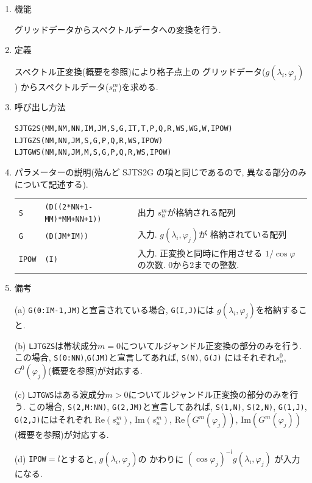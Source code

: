 \documentclass[a4j]{jarticle}
\newcommand{\re}{\mbox{Re}}
\newcommand{\im}{\mbox{Im}}
\begin{document}
\begin{enumerate}

\item 機能 

グリッドデータからスペクトルデータへの変換を行う.

\item 定義

スペクトル正変換(概要を参照)により格子点上の
グリッドデータ($g(\lambda_i,\varphi_j)$)
からスペクトルデータ($s^m_n$)を求める.

\item 呼び出し方法 

{\tt SJTG2S(MM,NM,NN,IM,JM,S,G,IT,T,P,Q,R,WS,WG,W,IPOW)}\\
{\tt LJTGZS(NM,NN,JM,S,G,P,Q,R,WS,IPOW)}\\
{\tt LJTGWS(NM,NN,JM,M,S,G,P,Q,R,WS,IPOW)}
  
\item パラメーターの説明(殆んど SJTS2G の項と同じであるので,
異なる部分のみについて記述する).

\begin{tabular}{lll}
{\tt S} & {\tt (D((2*NN+1-MM)*MM+NN+1))} & 出力 $s^m_n$が格納される配列\\
{\tt G} & {\tt (D(JM*IM))} & 入力. $g(\lambda_i,\varphi_j)$が
 格納されている配列\\
{\tt IPOW} & {\tt (I)} & 入力. 正変換と同時に作用させる
                      $1/\cos\varphi$の次数. 0から2までの整数.
\end{tabular}

\item 備考

(a) {\tt G(0:IM-1,JM)}と宣言されている場合, {\tt G(I,J)}には
    $g(\lambda_i,\varphi_j)$を格納すること.

(b) {\tt LJTGZS}は帯状成分$m=0$についてルジャンドル正変換の部分のみを行う.
    この場合,
    {\tt S(0:NN)},{\tt G(JM)}と宣言してあれば, {\tt S(N)}, {\tt G(J)}
    にはそれぞれ$s^0_n$, $G^0(\varphi_j)$(概要を参照)が対応する.

(c) {\tt LJTGWS}はある波成分$m>0$についてルジャンドル正変換の部分のみを行う.
    この場合,
    {\tt S(2,M:NN)}, {\tt G(2,JM)}と宣言してあれば, 
    {\tt S(1,N)}, {\tt S(2,N)}, {\tt G(1,J)}, {\tt G(2,J)}にはそれぞれ
    $\re(s^m_n)$, $\im(s^m_n)$, $\re(G^m(\varphi_j))$, $\im(G^m(\varphi_j))$
    (概要を参照)が対応する.
    
(d) {\tt IPOW}$=l$とすると, $g(\lambda_i,\varphi_j)$の
    かわりに $(\cos\varphi_j)^{-l}g(\lambda_i,\varphi_j)$ が入力
    になる. 
   
\end{enumerate}
\end{document}

